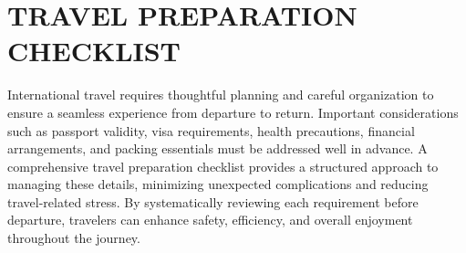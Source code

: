 
\section*{\centering TRAVEL PREPARATION CHECKLIST}
\vspace*{0.5cm}

International travel requires thoughtful planning and careful organization to ensure a seamless experience from departure to return. Important considerations such as passport validity, visa requirements, health precautions, financial arrangements, and packing essentials must be addressed well in advance. A comprehensive travel preparation checklist provides a structured approach to managing these details, minimizing unexpected complications and reducing travel-related stress. By systematically reviewing each requirement before departure, travelers can enhance safety, efficiency, and overall enjoyment throughout the journey.


